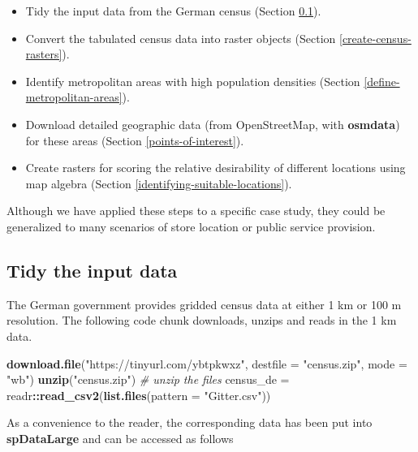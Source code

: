 \documentclass[]{krantz}
\newenvironment{Shaded}{\begin{snugshade}}{\end{snugshade}}
\newcommand{\CommentTok}[1]{\textcolor[rgb]{0.37,0.37,0.37}{\textit{#1}}}
\newcommand{\DataTypeTok}[1]{\textcolor[rgb]{0.27,0.27,0.27}{#1}}
\newcommand{\KeywordTok}[1]{\textcolor[rgb]{0.27,0.27,0.27}{\textbf{#1}}}
\newcommand{\NormalTok}[1]{#1}
\newcommand{\OperatorTok}[1]{\textcolor[rgb]{0.43,0.43,0.43}{\textbf{#1}}}
\newcommand{\StringTok}[1]{\textcolor[rgb]{0.5,0.5,0.5}{#1}}
\providecommand{\tightlist}{%
  \setlength{\itemsep}{0pt}\setlength{\parskip}{0pt}}
\begin{document}
\begin{itemize}
\tightlist
\item
  Tidy the input data from the German census (Section \ref{tidy-the-input-data}).
\item
  Convert the tabulated census data into raster objects (Section \ref{create-census-rasters}).
\item
  Identify metropolitan areas with high population densities (Section \ref{define-metropolitan-areas}).
\item
  Download detailed geographic data (from OpenStreetMap, with \textbf{osmdata}) for these areas (Section \ref{points-of-interest}).
\item
  Create rasters for scoring the relative desirability of different locations using map algebra (Section \ref{identifying-suitable-locations}).
\end{itemize}

Although we have applied these steps to a specific case study, they could be generalized to many scenarios of store location or public service provision.

\hypertarget{tidy-the-input-data}{%
\subsection{Tidy the input data}\label{tidy-the-input-data}}

The German government provides gridded census data at either 1 km or 100 m resolution.
The following code chunk downloads, unzips and reads in the 1 km data.

\begin{Shaded}
\begin{Highlighting}[]
\KeywordTok{download.file}\NormalTok{(}\StringTok{"https://tinyurl.com/ybtpkwxz"}\NormalTok{, }
              \DataTypeTok{destfile =} \StringTok{"census.zip"}\NormalTok{, }\DataTypeTok{mode =} \StringTok{"wb"}\NormalTok{)}
\KeywordTok{unzip}\NormalTok{(}\StringTok{"census.zip"}\NormalTok{) }\CommentTok{# unzip the files}
\NormalTok{census_de =}\StringTok{ }\NormalTok{readr}\OperatorTok{::}\KeywordTok{read_csv2}\NormalTok{(}\KeywordTok{list.files}\NormalTok{(}\DataTypeTok{pattern =} \StringTok{"Gitter.csv"}\NormalTok{))}
\end{Highlighting}
\end{Shaded}

As a convenience to the reader, the corresponding data has been put into \textbf{spDataLarge} and can be accessed as follows
\end{document}
